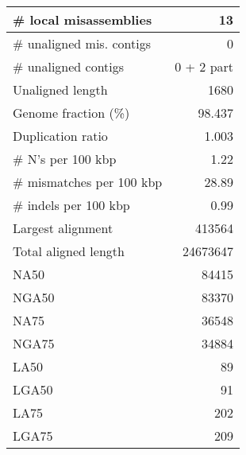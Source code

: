 \documentclass[12pt,a4paper]{article}
\begin{document}
\begin{table}[ht]
\begin{center}
\begin{tabular}{|l*{1}{|r}|}
\# local misassemblies & 13 \\ \hline
\# unaligned mis. contigs & 0 \\ \hline
\# unaligned contigs & 0 + 2 part \\ \hline
Unaligned length & 1680 \\ \hline
Genome fraction (\%) & 98.437 \\ \hline
Duplication ratio & 1.003 \\ \hline
\# N's per 100 kbp & 1.22 \\ \hline
\# mismatches per 100 kbp & 28.89 \\ \hline
\# indels per 100 kbp & 0.99 \\ \hline
Largest alignment & 413564 \\ \hline
Total aligned length & 24673647 \\ \hline
NA50 & 84415 \\ \hline
NGA50 & 83370 \\ \hline
NA75 & 36548 \\ \hline
NGA75 & 34884 \\ \hline
LA50 & 89 \\ \hline
LGA50 & 91 \\ \hline
LA75 & 202 \\ \hline
LGA75 & 209 \\ \hline
\end{tabular}
\end{center}
\end{table}
\end{document}
